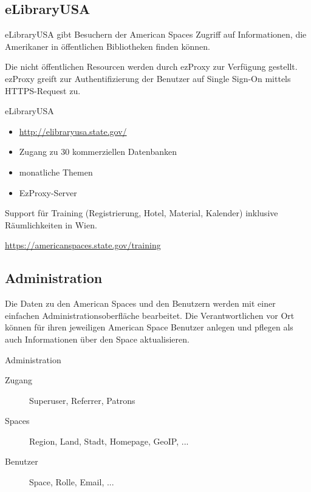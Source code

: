 \subsection{eLibraryUSA}

eLibraryUSA gibt Besuchern der American Spaces Zugriff
auf Informationen, die Amerikaner in öffentlichen
Bibliotheken finden können.
    
Die nicht öffentlichen Resourcen werden durch ezProxy zur
Verfügung gestellt. ezProxy greift zur Authentifizierung
der Benutzer auf Single Sign-On mittels HTTPS-Request zu.

\begin{frame}{eLibraryUSA}
\begin{itemize}
\item \url{http://elibraryusa.state.gov/}
\item Zugang zu 30 kommerziellen Datenbanken
\item monatliche Themen
\item EzProxy-Server
\end{itemize}
\end{frame}


Support für Training (Registrierung, Hotel, Material, Kalender)
inklusive Räumlichkeiten in Wien.

\url{https://americanspaces.state.gov/training}
    
\subsection{Administration}

Die Daten zu den American Spaces und den Benutzern werden
mit einer einfachen Administrationsoberfläche bearbeitet.
Die Verantwortlichen vor Ort können für ihren
jeweiligen American Space Benutzer anlegen und pflegen
als auch Informationen über den Space aktualisieren.

\begin{frame}{Administration}
\begin{description}
\item[Zugang] Superuser, Referrer, Patrons
\item[Spaces] Region, Land, Stadt, Homepage, GeoIP, ...
\item[Benutzer] Space, Rolle, Email, ...
\end{description}
\end{frame}

